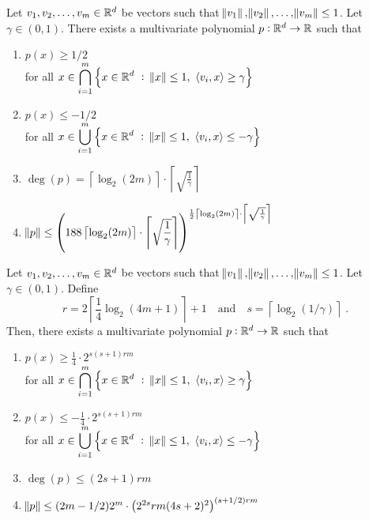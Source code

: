 \begin{theorem}
\label{theorem:polynomial-approximation-1}
Let $v_1, v_2, \dots, v_m \in \mathbb{R}^d$ be vectors such that $\norm{v_1},
\norm{v_2}, \dots, \norm{v_m} \le 1$. Let $\gamma \in (0,1)$. There exists a
multivariate polynomial $p:\mathbb{R}^d \to \mathbb{R}$ such that
\begin{enumerate}
\item $p(x) \ge 1/2$ \\ for all $\displaystyle x \in \bigcap_{i=1}^m \left\{ x \in \mathbb{R}^d ~:~ \norm{x} \le 1, \ \left\langle v_i, x \right\rangle \ge \gamma \right\}$
\item $p(x) \le -1/2$ \\ for all $\displaystyle x \in \bigcup_{i=1}^m \left\{ x \in \mathbb{R}^d ~:~ \norm{x} \le 1, \ \left\langle v_i, x \right\rangle \le - \gamma \right\}$
\item $\displaystyle \deg(p) = \left\lceil \log_2(2m) \right\rceil \cdot \left\lceil \sqrt{\frac{1}{\gamma}} \right\rceil$
\item $\displaystyle \norm{p} \le \left( 188 \left\lceil \log_2(2m) \right\rceil \cdot \left\lceil \sqrt{\frac{1}{\gamma}} \right\rceil \right)^{\frac{1}{2} \left\lceil \log_2(2m) \right\rceil \cdot \left\lceil \sqrt{\frac{1}{\gamma}} \right\rceil}$
\end{enumerate}
\end{theorem}

\begin{theorem}
\label{theorem:polynomial-approximation-2}
Let $v_1, v_2, \dots, v_m \in \mathbb{R}^d$ be vectors such that $\norm{v_1},
\norm{v_2}, \dots, \norm{v_m} \le 1$. Let $\gamma \in (0,1)$.
Define
$$
r = 2 \left\lceil \frac{1}{4} \log_2(4m + 1) \right\rceil + 1 \quad \text{and} \quad s = \left \lceil \log_2(1/\gamma) \right \rceil \; .
$$
Then, there exists a multivariate polynomial $p:\mathbb{R}^d \to \mathbb{R}$ such that
\begin{enumerate}
\item $\displaystyle p(x) \ge \frac{1}{4} \cdot 2^{s(s+1)rm}$ \\
for all $\displaystyle x \in \bigcap_{i=1}^m \left\{ x \in \mathbb{R}^d ~:~ \norm{x} \le 1, \ \left\langle v_i, x \right\rangle \ge \gamma \right\}$

\item $\displaystyle p(x) \le - \frac{1}{4} \cdot 2^{s(s+1)rm}$ \\
for all $\displaystyle x \in \bigcup_{i=1}^m \left\{ x \in \mathbb{R}^d ~:~ \norm{x} \le 1, \ \left\langle v_i, x \right\rangle \le - \gamma \right\}$

\item $\deg(p) \le (2s+1) rm$
\item $\norm{p} \le (2m-1/2) 2^m \cdot \left(2^{2s} rm (4s+2)^2 \right)^{(s+1/2)rm}$
\end{enumerate}
\end{theorem}

